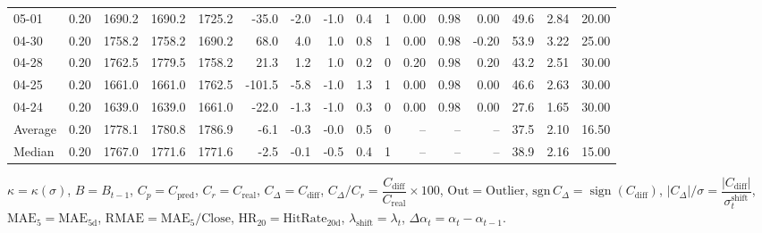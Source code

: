 \begin{threeparttable}
{\begin{tabular}{lrrrrrrrrrrrrrrr}
  05-01 &     0.20 & 1690.2 & 1690.2 & 1725.2 &      -35.0 &           -2.0 &                     -1.0 &                 0.4 &              1 &       0.00 &      0.98 &           0.00 &             49.6 &            2.84 &                  20.00 \\
  04-30 &     0.20 & 1758.2 & 1758.2 & 1690.2 &       68.0 &            4.0 &                      1.0 &                 0.8 &              1 &       0.00 &      0.98 &          -0.20 &             53.9 &            3.22 &                  25.00 \\
  04-28 &     0.20 & 1762.5 & 1779.5 & 1758.2 &       21.3 &            1.2 &                      1.0 &                 0.2 &              0 &       0.20 &      0.98 &           0.20 &             43.2 &            2.51 &                  30.00 \\
  04-25 &     0.20 & 1661.0 & 1661.0 & 1762.5 &     -101.5 &           -5.8 &                     -1.0 &                 1.3 &              1 &       0.00 &      0.98 &           0.00 &             46.6 &            2.63 &                  30.00 \\
  04-24 &     0.20 & 1639.0 & 1639.0 & 1661.0 &      -22.0 &           -1.3 &                     -1.0 &                 0.3 &              0 &       0.00 &      0.98 &           0.00 &             27.6 &            1.65 &                  30.00 \\
Average &     0.20 & 1778.1 & 1780.8 & 1786.9 &       -6.1 &           -0.3 &                     -0.0 &                 0.5 &              0 &         -- &        -- &             -- &             37.5 &            2.10 &                  16.50 \\
 Median &     0.20 & 1767.0 & 1771.6 & 1771.6 &       -2.5 &           -0.1 &                     -0.5 &                 0.4 &              1 &         -- &        -- &             -- &             38.9 &            2.16 &                  15.00 \\
\bottomrule
\end{tabular}
}
\begin{tablenotes}\footnotesize
\item $\kappa=\kappa(\sigma)$, $B=B_{t-1}$, $C_p=C_{\text{pred}}$, $C_r=C_{\text{real}}$, $C_\Delta=C_{\text{diff}}$, $C_\Delta/C_r=\dfrac{C_{\text{diff}}}{C_{\text{real}}}\times100$, $\mathrm{Out}=\text{Outlier}$, $\mathrm{sgn}\,C_\Delta=\operatorname{sign}(C_{\text{diff}})$, $|C_\Delta|/\sigma=\dfrac{|C_{\text{diff}}|}{\sigma_t^{\text{shift}}}$, $\mathrm{MAE}_5=\mathrm{MAE}_{5\text{d}}$, $\mathrm{RMAE}= \mathrm{MAE}_5 / \text{Close}$, $\mathrm{HR}_{20}=\mathrm{HitRate}_{20\text{d}}$, 
$\lambda_{\text{shift}}=\lambda_t$, 
$\Delta\alpha_t=\alpha_t-\alpha_{t-1}$.
\end{tablenotes}
\end{threeparttable}
\endgroup

